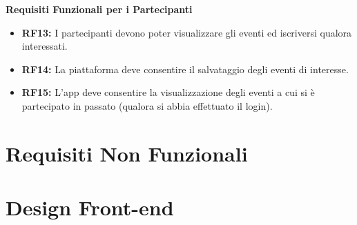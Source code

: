 \documentclass[9pt]{extarticle}
\begin{document}
\textbf{Requisiti Funzionali per i Partecipanti}
\begin{itemize}
	\item \textbf{RF13:} I partecipanti devono poter visualizzare gli eventi ed iscriversi qualora interessati.
	\item \textbf{RF14:} La piattaforma deve consentire il salvataggio degli eventi di interesse.
	\item \textbf{RF15:} L'app deve consentire la visualizzazione degli eventi a cui si è partecipato in passato (qualora si abbia effettuato il login).
\end{itemize}

\section{Requisiti Non Funzionali}
\section{Design Front-end}
\end{document}
